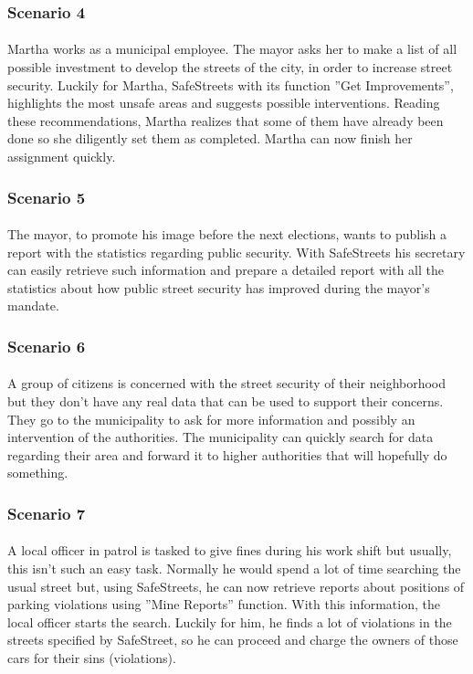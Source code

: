 				\subsubsection{Scenario 4}
					\paragraph{}
						Martha works as a municipal employee. The mayor asks her to make a list of all possible investment to develop the streets of the city, in order to increase street security. Luckily for Martha, SafeStreets with its function ''Get Improvements'', highlights the most unsafe areas and suggests possible interventions. Reading these recommendations, Martha realizes that some of them have already been done so she diligently set them as completed. Martha can now finish her assignment quickly.
				\subsubsection{Scenario 5}
					\paragraph{}
						The mayor, to promote his image before the next elections, wants to publish a report with the statistics regarding public security. With SafeStreets his secretary can easily retrieve such information and prepare a detailed report with all the statistics about how public street security has improved during the mayor's mandate.
				\subsubsection{Scenario 6}
					\paragraph{}
						A group of citizens is concerned with the street security of their neighborhood but they don't have any real data that can be used to support their concerns. They go to the municipality to ask for more information and possibly an intervention of the authorities. The municipality can quickly search for data regarding their area and forward it to higher authorities that will hopefully do something.
				\subsubsection{Scenario 7}
					\paragraph{}
						A local officer in patrol is tasked to give fines during his work shift but usually, this isn't such an easy task. Normally he would spend a lot of time searching the usual street but, using SafeStreets, he can now retrieve reports about positions of parking violations using ''Mine Reports'' function. With this information, the local officer starts the search. Luckily for him, he finds a lot of violations in the streets specified by SafeStreet, so he can proceed and charge the owners of those cars for their sins (violations).
			\clearpage
